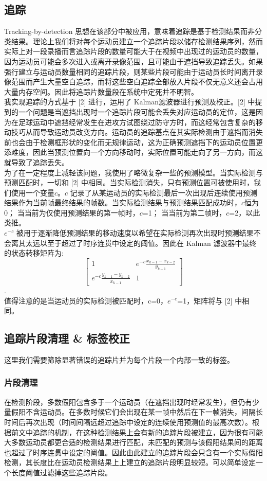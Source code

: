 \documentclass{article}
\begin{document}
\subsection{追踪}
Tracking-by-detection 思想在该部分中被应用，意味着追踪是基于检测结果而非分类结果。理论上我们将对每个运动员建立一个追踪片段以储存检测结果序列，然而实际上对一段录播而言追踪片段的数量可能大于在视频中出现过的运动员的数量，因为运动员可能会多次进入或离开录像范围，且可能由于遮挡导致追踪丢失。如果强行建立与运动员数量相同的追踪片段，则某些片段可能由于运动员长时间离开录像范围而产生大量空白追踪，而将这些空白追踪全部放入片段不仅无意义还会占用大量内存空间。因此将追踪片数量段在系统中定死并不明智。\\
我实现追踪的方式基于 [2] 进行，运用了 Kalman滤波器进行预测及校正。[2] 中提到的一个问题是当遮挡出现时一个追踪片段可能会丢失对应运动员的定位，这是因为在足球运动中遮挡经常发生在进攻方试图绕过防守方时，而这经常包含复杂的移动技巧从而导致运动员改变方向。运动员的追踪基点在其实际检测由于遮挡而消失前也会由于检测框形状的变化而无规律运动，这为正确预测遮挡下的运动员位置更添难度，因此当预测位置向一个方向移动时，实际位置可能走向了另一方向，而这就导致了追踪丢失。\\
为了在一定程度上减轻该问题，我使用了略微复杂一些的预测模型。当实际检测与预测匹配时，一切和 [2] 中相同。当实际检测消失，只有预测位置可被使用时，我们使用一个变量$c$。$c$ 记录了从某运动员的实际检测最后一次出现后连续使用预测结果作为当前帧最终结果的帧数。当实际检测结果与预测结果匹配成功时，$c$恒为0； 当当前为仅使用预测结果的第一帧时，$c$=1； 当当前为第二帧时，$c$=2，以此类推。\\
$e^{-c}$ 被用于逐渐降低预测结果的移动速度以希望在实际检测再次出现时预测结果不会离其太远以至于超过了时序连贯中设定的阈值。因此在 Kalman 滤波器中最终的状态转移矩阵为:\\
\[\begin{bmatrix}1 & e^{-c}\frac{x_{k-1}-x_{k-2}}{y_{k-1}} \\e^{-c}\frac{y_{k-1}-y_{k-2}}{x_{k-1}} & 1 \end{bmatrix}\].\\
值得注意的是当运动员的实际检测被匹配时，c=0，$e^{-c}$=1，矩阵将与 [2] 中相同。
\subsection{追踪片段清理 \& 标签校正}
这里我们需要筛除显著错误的追踪片并为每个片段一个内部一致的标签。
\subsubsection{片段清理}
在检测阶段，多数假阳包含多于一个运动员（在遮挡出现时经常发生），但仍有少量假阳不含运动员。在多数时候它们会出现在某一帧中然后在下一帧消失，间隔长时间后再次出现（时间间隔远超过追踪中设定的连续使用预测值的最高次数）。根据前文中追踪的机制，在这种检测结果上会有新的追踪片段被建立，因为很有可能大多数运动员都更合适的检测结果进行匹配，未匹配的预测与该假阳结果间的距离也超过了时序连贯中设定的阈值。因此由此建立的追踪片段会只含有一个实际假阳检测，其长度比在运动员检测结果上上建立的追踪片段明显较短。可以简单设定一个长度阈值过滤掉这些追踪片段。
\end{document}
